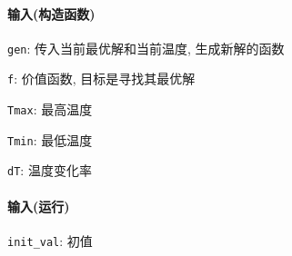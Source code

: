 \paragraph{输入(构造函数)}

\verb|gen|: 传入当前最优解和当前温度, 生成新解的函数

\verb|f|: 价值函数, 目标是寻找其最优解

\verb|Tmax|: 最高温度

\verb|Tmin|: 最低温度

\verb|dT|: 温度变化率

\paragraph{输入(运行)}

\verb|init_val|: 初值
